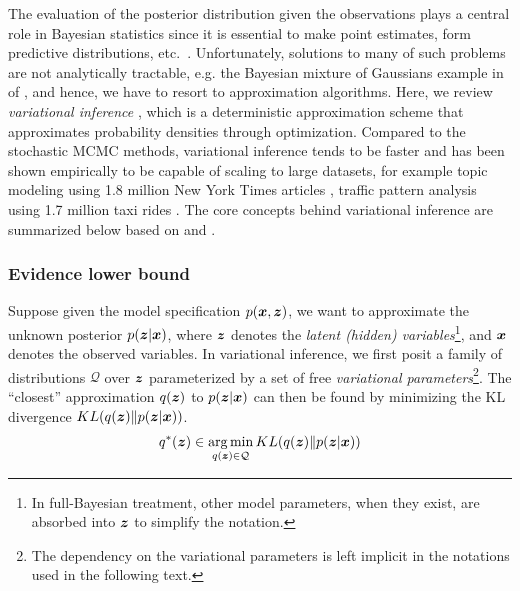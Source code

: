 The evaluation of the posterior distribution given the observations plays a central role in Bayesian statistics since it is essential to make point estimates, form predictive distributions, etc.\ \citep{bishop2006pattern}.
Unfortunately, solutions to many of such problems are not analytically tractable, e.g. the Bayesian mixture of Gaussians example in  of \cite{blei2017variational}, and hence, we have to resort to approximation algorithms.
Here, we review \emph{variational inference} \citep{jordan1999introduction, wainwright2008graphical}, which is a deterministic approximation scheme that approximates probability densities through optimization.
Compared to the stochastic MCMC methods, variational inference tends to be faster and has been shown empirically to be capable of scaling to large datasets, for example topic modeling using 1.8 million New York Times articles \citep{hoffman2013stochastic}, traffic pattern analysis using 1.7 million taxi rides \citep{kucukelbir2017automatic}.
The core concepts behind variational inference are summarized below based on \cite{bishop2006pattern} and \cite{blei2017variational}.

\subsubsection*{Evidence lower bound}

Suppose given the model specification $p(\boldsymbol{x},\boldsymbol{z})$, we want to approximate the unknown posterior $p(\boldsymbol{z}\vert\boldsymbol{x})$, where $\boldsymbol{z}$ denotes the \emph{latent (hidden) variables}\footnote{In full-Bayesian treatment, other model parameters, when they exist, are absorbed into $\boldsymbol{z}$ to simplify the notation.}, and $\boldsymbol{x}$ denotes the observed variables.
In variational inference, we first posit a family of distributions $\mathcal{Q}$ over $\boldsymbol{z}$ parameterized by a set of free \emph{variational parameters}\footnote{The dependency on the variational parameters is left implicit in the notations used in the following text.}.
The ``closest'' approximation $q(\boldsymbol{z})$ to $p(\boldsymbol{z}\vert\boldsymbol{x})$ can then be found by minimizing the KL divergence $KL(q(\boldsymbol{z})\|p(\boldsymbol{z} \vert \boldsymbol{x}))$.
\begin{align}
    q^*(\boldsymbol{z}) \in \operatorname*{arg\,min}_{q(\boldsymbol{z})\in\mathcal{Q}} KL(q(\boldsymbol{z}) \| p(\boldsymbol{z} \vert \boldsymbol{x}))
\end{align}

